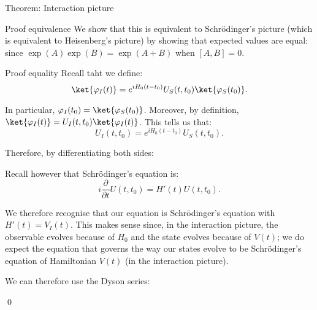 \documentclass[a4paper]{article}
\begin{document}
\begin{parag}{Theorem: Interaction picture}
    \begin{subparag}{Proof equivalence}
        We show that this is equivalent to Schrödinger's picture (which is equivalent to Heisenberg's picture) by showing that expected values are equal: 
        since $\exp\left(A\right)\exp\left(B\right) = \exp\left(A+B\right)$ when $\left[A, B\right] = 0$.
    \end{subparag}

    \begin{subparag}{Proof equality}
        Recall taht we define: 
        \[\ket{\phi_I\left(t\right)} = e^{i H_0\left(t - t_0\right)} U_S\left(t, t_0\right) \ket{\phi_S\left(t_0\right)}.\]

        In particular, $\phi_I\left(t_0\right) = \ket{\phi_S\left(t_0\right)}$. Moreover, by definition, $\ket{\phi_I\left(t\right)} = U_I\left(t, t_0\right) \ket{\phi_I\left(t\right)}$. This tells us that:
        \[U_I\left(t, t_0\right) = e^{i H_0 \left(t - t_0\right)} U_S\left(t, t_0\right).\]
        

        Therefore, by differentiating both sides:

        Recall however that Schrödinger's equation is: 
        \[i \frac{\partial}{\partial t} U\left(t, t_0\right) = H'\left(t\right) U\left(t, t_0\right).\]

        We therefore recognise that our equation is Schrödinger's equation with $H'\left(t\right) = V_I\left(t\right)$. This makes sense since, in the interaction picture, the observable evolves because of $H_0$ and the state evolves because of $V\left(t\right)$; we do expect the equation that governs the way our states evolve to be Schrödinger's equation of Hamiltonian $V\left(t\right)$ (in the interaction picture).

        We can therefore use the Dyson series:

        \qed
    \end{subparag}
\end{parag}
\end{document}
